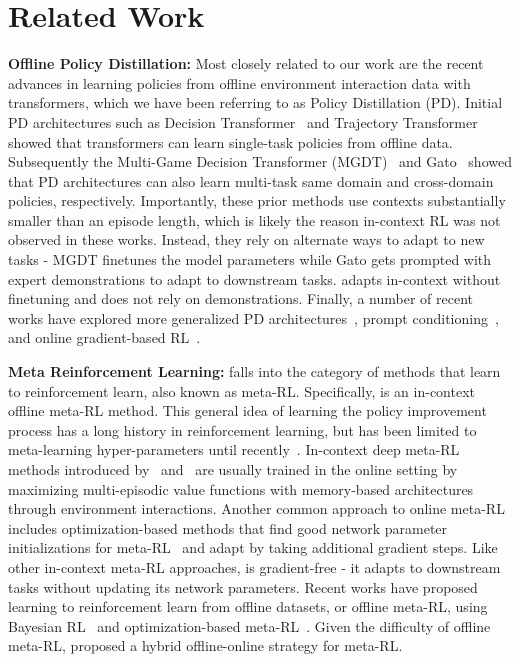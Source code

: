 \section{Related Work}
\label{sec:related-work}


{\bf Offline Policy Distillation:} Most closely related to our work are the recent advances in learning policies from offline environment interaction data with transformers, which we have been referring to as Policy Distillation (PD). Initial PD architectures such as Decision Transformer~\citep{chen2021dt} and Trajectory Transformer~\citep{janner2021tto} showed that transformers can learn single-task policies from offline data. Subsequently the Multi-Game Decision Transformer (MGDT)~\citep{lee2022mgdt} and Gato~\citep{reed2022gato} showed that PD architectures can also learn multi-task same domain and cross-domain policies, respectively. Importantly, these prior methods use contexts substantially smaller than an episode length, which is likely the reason in-context RL was not observed in these works. Instead, they rely on alternate ways to adapt to new tasks - MGDT finetunes the model parameters while Gato gets prompted with expert demonstrations to adapt to downstream tasks. \name adapts in-context without finetuning and does not rely on demonstrations.
Finally, a number of recent works have explored more generalized PD architectures~\citep{furuta2022gdt}, prompt conditioning~\citep{xu2022pdt}, and online gradient-based RL~\citep{zheng2022odt}.


{\bf Meta Reinforcement Learning:} \name falls into the category of methods that learn to reinforcement learn, also known as meta-RL. Specifically, \name is an in-context offline meta-RL method. This general idea of learning the policy improvement process has a long history in reinforcement learning, but has been limited to meta-learning hyper-parameters until recently~\citep{ishii2002control}. In-context deep meta-RL methods introduced by~\citet{wang2016metarl} and~\citet{duan2016rl2} are usually trained in the online setting by maximizing multi-episodic value functions with memory-based architectures through environment interactions. Another common approach to online meta-RL includes optimization-based methods that find good network parameter initializations for meta-RL~\citep{hochreiter2001learning, finn17maml, nichol2018reptile} and adapt by taking additional gradient steps. Like other in-context meta-RL approaches, \name is gradient-free - it adapts to downstream tasks without updating its network parameters. Recent works have proposed learning to reinforcement learn from offline datasets, or offline meta-RL, using Bayesian RL~\citep{dorfman21omrl} and optimization-based meta-RL~\citep{mitchell21macaw}. Given the difficulty of offline meta-RL, \citet{pong2022offline} proposed a hybrid offline-online strategy for meta-RL. 


